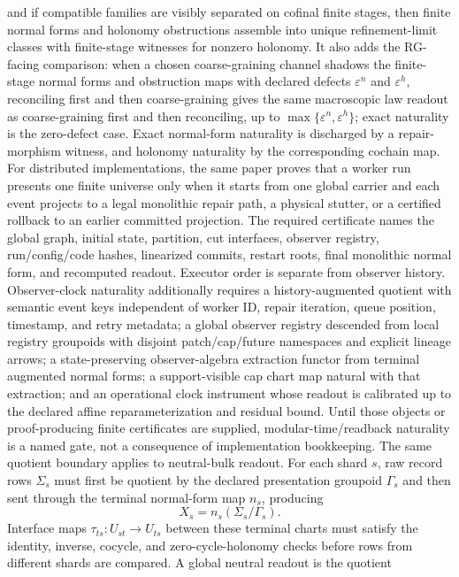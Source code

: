 and if compatible families are visibly separated on cofinal finite stages, then finite normal
forms and holonomy obstructions assemble into unique refinement-limit classes with finite-stage
witnesses for nonzero holonomy. It also adds the RG-facing comparison: when a chosen
coarse-graining channel shadows the finite-stage normal forms and obstruction maps with declared
defects \(\varepsilon^n\) and \(\varepsilon^h\), reconciling first and then coarse-graining gives
the same macroscopic law readout as coarse-graining first and then reconciling, up to
\(\max\{\varepsilon^n,\varepsilon^h\}\); exact naturality is the zero-defect case. Exact
normal-form naturality is discharged by a repair-morphism witness, and holonomy naturality by the
corresponding cochain map. For distributed implementations, the same paper proves that a worker
run presents one finite universe only when it starts from one global carrier and each event
projects to a legal monolithic repair path, a physical stutter, or a certified rollback to an
earlier committed projection. The required certificate names the global graph, initial state,
partition, cut interfaces, observer registry, run/config/code hashes, linearized commits,
restart roots, final monolithic normal form, and recomputed readout. Executor order is separate
from observer history. Observer-clock naturality additionally requires a
history-augmented quotient with semantic event keys independent of worker ID, repair iteration,
queue position, timestamp, and retry metadata; a global observer registry descended from local
registry groupoids with disjoint patch/cap/future namespaces and explicit lineage arrows; a
state-preserving observer-algebra extraction functor from terminal augmented normal forms; a
support-visible cap chart map natural with that extraction; and an operational clock instrument
whose readout is calibrated up to the declared affine reparameterization and residual bound.
Until those objects or proof-producing finite certificates are supplied, modular-time/readback
naturality is a named gate, not a consequence of implementation bookkeeping. The same
quotient boundary applies to neutral-bulk readout. For each shard \(s\), raw record rows
\(\Sigma_s\) must first be quotient by the declared presentation groupoid \(\Gamma_s\) and then
sent through the terminal normal-form map \(n_s\), producing
\[
X_s=n_s(\Sigma_s/\Gamma_s).
\]
Interface maps \(\tau_{ts}:U_{st}\to U_{ts}\) between these terminal charts must satisfy the
identity, inverse, cocycle, and zero-cycle-holonomy checks before rows from different shards are
compared. A global neutral readout is the quotient
